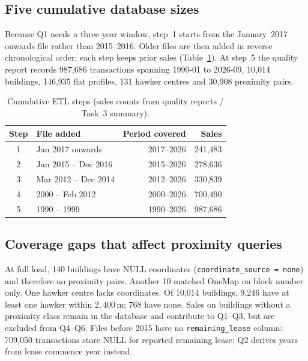 \subsection{Five cumulative database sizes}
Because Q1 needs a three-year window, step~1 starts from the January~2017 onwards file rather than 2015--2016.
Older files are then added in reverse chronological order; each step keeps prior sales (Table~\ref{tab:steps}).
At step~5 the quality report records 987{,}686 transactions spanning 1990-01 to 2026-09, 10{,}014 buildings, 146{,}935 flat profiles, 131 hawker centres and 30{,}908 proximity pairs.

\begin{table}[H]
\centering
\caption{Cumulative ETL steps (sales counts from quality reports / Task~3 summary).}
\label{tab:steps}
\begin{tabular}{@{}clrr@{}}
\toprule
Step & File added & Period covered & Sales \\
\midrule
1 & Jan 2017 onwards & 2017--2026 & 241{,}483 \\
2 & Jan 2015 -- Dec 2016 & 2015--2026 & 278{,}636 \\
3 & Mar 2012 -- Dec 2014 & 2012--2026 & 330{,}839 \\
4 & 2000 -- Feb 2012 & 2000--2026 & 700{,}490 \\
5 & 1990 -- 1999 & 1990--2026 & 987{,}686 \\
\bottomrule
\end{tabular}
\end{table}

\subsection{Coverage gaps that affect proximity queries}
At full load, 140 buildings have NULL coordinates (\texttt{coordinate\_source = none}) and therefore no proximity pairs.
Another 10 matched OneMap on block number only.
One hawker centre lacks coordinates.
Of 10{,}014 buildings, 9{,}246 have at least one hawker within $2{,}400\,\mathrm{m}$; 768 have none.
Sales on buildings without a proximity class remain in the database and contribute to Q1--Q3, but are excluded from Q4--Q6.
Files before 2015 have no \texttt{remaining\_lease} column: 709{,}050 transactions store NULL for reported remaining lease; Q2 derives years from lease commence year instead.

